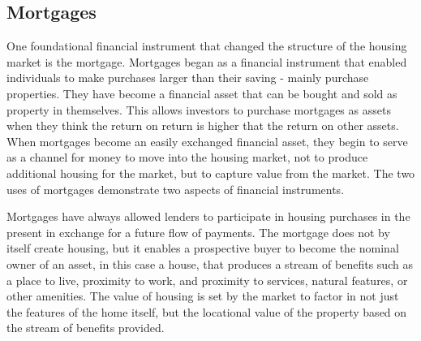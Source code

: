 




\subsection{Mortgages}
One foundational financial instrument that changed the structure of the housing market is the mortgage. 
Mortgages began as  a financial instrument that enabled individuals to make purchases larger than their saving - mainly  purchase properties.   They have become a financial asset that can be bought and sold as property in themselves. This allows investors to purchase mortgages as assets when they think the return on  return  is higher that the return on other assets.  When mortgages become an easily exchanged financial asset, they begin to serve as a channel for money to move into the housing market, not to produce additional housing for the market, but to capture value from the market. The two uses of mortgages demonstrate two aspects of financial instruments.  

Mortgages have always allowed lenders to participate in housing purchases in the present in exchange for a future flow of payments. The mortgage does not by itself create housing, but it enables a prospective buyer to become the nominal owner of an asset, in this case a house, that produces a stream of benefits such as a place to live, proximity to work, and proximity to services, natural features, or other amenities. The value of housing is set by the market to factor in not just the features of the home itself, but the locational value of the property based on the stream of benefits provided. 

